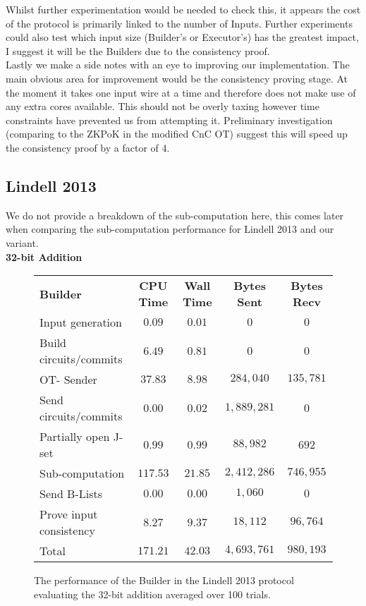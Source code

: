\documentclass[ %
                    author={Nicholas Tutte},
                supervisor={Prof. Nigel Smart},
                    degree={MEng},
                     title={Secure Two Party Computation},
                  subtitle={A practical comparison of recent protocols},
                      type={Research - GG1K},
                      year={2015} ]{dissertation}
\begin{document}
				Whilst further experimentation would be needed to check this, it appears the cost of the protocol is primarily linked to the number of Inputs. Further experiments could also test which input size (Builder's or Executor's) has the greatest impact, I suggest it will be the Builders due to the consistency proof.\\

				Lastly we make a side notes with an eye to improving our implementation. The main obvious area for improvement would be the consistency proving stage. At the moment it takes one input wire at a time and therefore does not make use of any extra cores available. This should not be overly taxing however time constraints have prevented us from attempting it. Preliminary investigation (comparing to the ZKPoK in the modified CnC OT) suggest this will speed up the consistency proof by a factor of 4.

			\pagebreak
			\subsection{Lindell 2013} \label{sub:L-2013_Results_Analysis}
				We do not provide a breakdown of the sub-computation here, this comes later when comparing the sub-computation performance for Lindell 2013 and our variant.\\

				\FloatBarrier
				\noindent \textbf{32-bit Addition}
				\begin{figure}[!ht]
					\begin{tabular}{| p{4.3cm} | c c c c |}
						\hline
						\textbf{Builder} & \textbf{CPU Time} & \textbf{Wall Time} & \textbf{Bytes Sent} & \textbf{Bytes Recv} \\
						\thickhline
						Input generation & $0.09$ & $0.01$ & $0$ & $0$ \\
						\hline
						Build circuits/commits & $6.49$ & $0.81$ & $0$ & $0$ \\
						\hline
						OT- Sender & $37.83$ & $8.98$ & $284,040$ & $135,781$ \\
						\hline
						Send circuits/commits & $0.00$ & $0.02$ & $1,889,281$ & $0$ \\
						\hline
						Partially open J-set & $0.99$ & $0.99$ & $88,982$ & $692$ \\
						\hline
						Sub-computation & $117.53$ & $21.85$ & $2,412,286$ & $746,955$ \\
						\hline
						Send B-Lists & $0.00$ & $0.00$ & $1,060$ & $0$ \\
						\hline
						Prove input consistency & $8.27$ & $9.37$ & $18,112$ & $96,764$ \\
						\thickhline
						Total & $171.21$ & $42.03$ & $4,693,761$ & $980,193$ \\
						\hline
					\end{tabular}
					\caption{The performance of the Builder in the Lindell 2013 protocol evaluating the 32-bit addition averaged over 100 trials. \label{table:L_2013_Add_Builder}}
				\end{figure}
\end{document}

